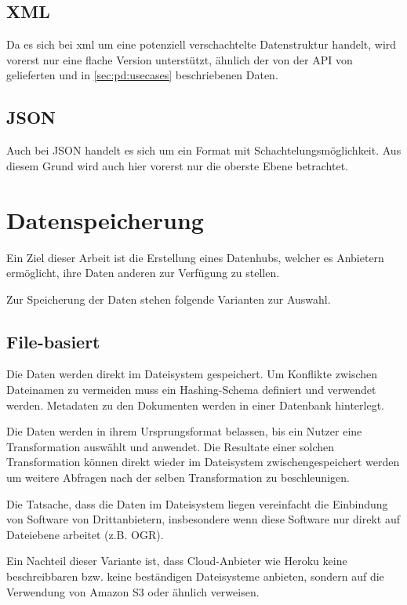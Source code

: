 \subsection{XML}
Da es sich bei \acs{xml} um eine potenziell verschachtelte Datenstruktur handelt, wird vorerst nur eine flache Version unterstützt, ähnlich der von der API von  gelieferten und in \cref{sec:pd:usecases} beschriebenen Daten. 

\subsection{JSON}
Auch bei JSON handelt es sich um ein Format mit Schachtelungsmöglichkeit. Aus diesem Grund wird auch hier vorerst nur die oberste Ebene betrachtet.

\section{Datenspeicherung}
Ein Ziel dieser Arbeit ist die Erstellung eines Datenhubs, welcher es Anbietern ermöglicht, ihre Daten anderen zur Verfügung zu stellen. 

Zur Speicherung der Daten stehen folgende Varianten zur Auswahl.

\subsection{File-basiert}
Die Daten werden direkt im Dateisystem gespeichert. Um Konflikte zwischen Dateinamen zu vermeiden muss ein Hashing-Schema definiert und verwendet werden. Metadaten zu den Dokumenten werden in einer Datenbank hinterlegt.

Die Daten werden in ihrem Ursprungsformat belassen, bis ein Nutzer eine Transformation auswählt und anwendet. Die Resultate einer solchen Transformation können direkt wieder im Dateisystem zwischengespeichert werden um weitere Abfragen nach der selben Transformation zu beschleunigen.

Die Tatsache, dass die Daten im Dateisystem liegen vereinfacht die Einbindung von Software von Drittanbietern, insbesondere wenn diese Software nur direkt auf Dateiebene arbeitet (z.B. OGR).

Ein Nachteil dieser Variante ist, dass Cloud-Anbieter wie Heroku keine beschreibbaren \cite{herokuReadOnlyFilesystem} bzw. keine beständigen \cite{herokuEphemeralFilesystem} Dateisysteme anbieten, sondern auf die Verwendung von Amazon S3 oder ähnlich verweisen.

